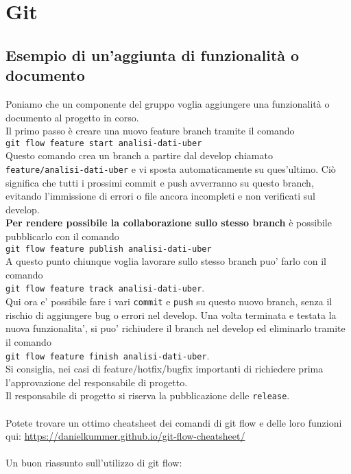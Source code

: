 \chapter{Git}

\section{Esempio di un'aggiunta di funzionalit\`{a} o documento}
Poniamo che un componente del gruppo voglia aggiungere una funzionalit\`{a} o documento al progetto in corso. \\
Il primo passo \`{e} creare una nuovo feature branch tramite il comando \\
\texttt{git flow feature start analisi-dati-uber}\\
Questo comando crea un branch a partire dal develop chiamato \texttt{feature/analisi-dati-uber} e vi sposta automaticamente su ques'ultimo. Ci\`{o} significa che tutti i prossimi commit e push avverranno su questo branch, evitando l'immissione di errori o file ancora incompleti e non verificati sul develop. \\
\textbf{Per rendere possibile la collaborazione sullo stesso branch} \`{e} possibile pubblicarlo con il comando \\
\texttt{git flow feature publish analisi-dati-uber}\\
A questo punto chiunque voglia lavorare sullo stesso branch puo' farlo con il comando \\
\texttt{git flow feature track analisi-dati-uber}.\\
Qui ora e' possibile fare i vari \texttt{commit} e \texttt{push} su questo nuovo branch, senza il rischio di aggiungere bug o errori nel develop.
Una volta terminata e testata la nuova funzionalita', si puo' richiudere il branch nel develop ed eliminarlo tramite il comando \\
\texttt{git flow feature finish analisi-dati-uber}.\\
Si consiglia, nei casi di feature/hotfix/bugfix importanti di richiedere prima l'approvazione del responsabile di progetto.\\
Il responsabile di progetto si riserva la pubblicazione delle \texttt{release}.\\
\\
Potete trovare un ottimo cheatsheet dei comandi di git flow e delle loro funzioni qui:
\url{https://danielkummer.github.io/git-flow-cheatsheet/}\\
\\
Un buon riassunto sull'utilizzo di git flow: \\
